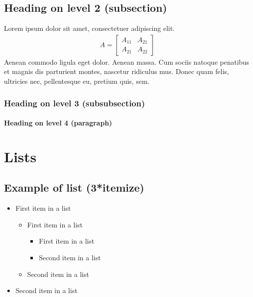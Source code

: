 \documentclass[paper=a4, fontsize=11pt]{scrartcl} %
\numberwithin{equation}{section} %
\numberwithin{figure}{section} %
\numberwithin{table}{section} %
\begin{document}

\subsection{Heading on level 2 (subsection)}

Lorem ipsum dolor sit amet, consectetuer adipiscing elit. 
\begin{align}
A = 
\begin{bmatrix}
A_{11} & A_{21} \\
A_{21} & A_{22}
\end{bmatrix}
\end{align}
Aenean commodo ligula eget dolor. Aenean massa. Cum sociis natoque penatibus et magnis dis parturient montes, nascetur ridiculus mus. Donec quam felis, ultricies nec, pellentesque eu, pretium quis, sem.


\subsubsection{Heading on level 3 (subsubsection)}

\lipsum[3] %

\paragraph{Heading on level 4 (paragraph)}

\lipsum[6] %


\section{Lists}


\subsection{Example of list (3*itemize)}
\begin{itemize}
	\item First item in a list 
		\begin{itemize}
		\item First item in a list 
			\begin{itemize}
			\item First item in a list 
			\item Second item in a list 
			\end{itemize}
		\item Second item in a list 
		\end{itemize}
	\item Second item in a list 
\end{itemize}
\end{document}
